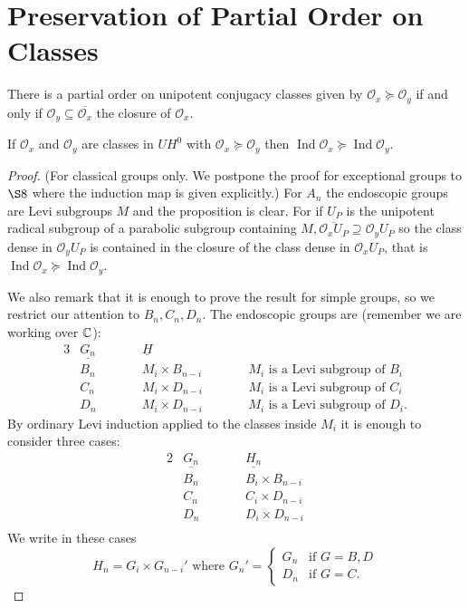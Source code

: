 \documentclass{amsart}
\newenvironment{cthm}[1]
  {\renewcommand\thethm{\sc #1}\thm}
  {\endthm}
\newcommand\C		{{\Bbb C}}
\newcommand\Ind	{\operatorname{Ind}}
\newcommand\cO		{{\mathcal O}}
\newcommand\UHo	{UH^0}
\begin{document}

\section{Preservation of Partial Order on Classes} %

\bigskip

There is a partial order on unipotent conjugacy classes given by
$\cO_x \succeq \cO_y$ if and only if $\cO_y \subseteq
\overline{\cO_x}$ the 
closure of $\cO_x$. 

\begin{cthm}{Proposition} If $\cO_x$ and $\cO_y$ are classes in $\UHo$
with
     $\cO_x \succeq \cO_y$ then $\Ind \cO_x \succeq \Ind \cO_y$.
     \end{cthm}

\begin{proof} (For classical groups only. We postpone the proof
for exceptional
     groups to $\S 8$ where the induction map is given
explicitly.)  For
     $A_n$ the endoscopic groups are Levi subgroups $M$ and the
proposition
     is clear.  For if $U_P$ is the unipotent radical subgroup of
a parabolic
     subgroup containing $M, \overline{\cO_xU_P} \supseteq
\cO_yU_P$ so the 
     class dense in $\cO_yU_P$ is contained in the closure of the
class dense in
     $\cO_xU_P$, that is $\Ind \cO_x \succeq \Ind \cO_y$.

We also remark that it is enough to prove the result for simple
groups, so
we restrict our attention to $B_n, C_n, D_n$.  The endoscopic
groups are
(remember we are working over $\C$):
     \begin{alignat*}{3}
     &\underline{G_n} &\qquad &\underline{H} && \\
     &B_n &\qquad &M_i \times B_{n-i} &\qquad 
          &M_i \text{ is a Levi subgroup of $B_i$} \\
     &C_n &\qquad &M_i \times D_{n-i} &\qquad 
          &M_i \text{ is a Levi subgroup of $C_i$} \\
     &D_n &\qquad &M_i \times D_{n-i} &\qquad 
          &M_i \text{ is a Levi subgroup of $D_i$.}
     \end{alignat*}
By ordinary Levi induction applied to the classes inside $M_i$ it
is enough
to consider three cases:
     \begin{alignat*} {2}
     &\underline{G_n} &\qquad &\underline{H_n}  \\
     &B_n &\qquad &B_i \times B_{n-i} \\
     &C_n &\qquad &C_i \times D_{n-i} \\
     &D_n &\qquad &D_i \times D_{n-i} \\
     \end{alignat*}
We write in these cases 
     $$
H_n = G_i \times G_{n-i}' \text{ where } G_n' =
\begin{cases} G_n &\text{if $G = B, D$} \\ D_n &\text{if $G=C$.}
\end{cases}
     $$


\end{proof}
\end{document}
